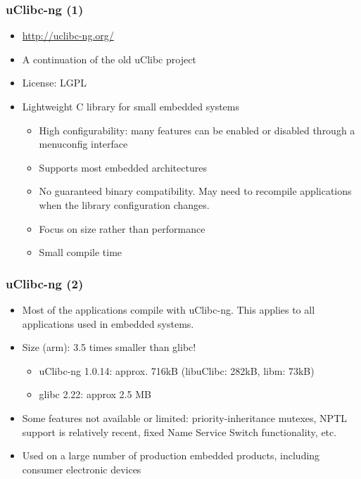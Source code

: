 \begin{frame}
  \frametitle{uClibc-ng (1)}
  \begin{itemize}
  \item \url{http://uclibc-ng.org/}
  \item A continuation of the old uClibc project
  \item License: LGPL
  \item Lightweight C library for small embedded systems
    \begin{itemize}
    \item High configurability: many features can be enabled or
      disabled through a menuconfig interface
    \item Supports most embedded architectures
    \item No guaranteed binary compatibility. May need to
      recompile applications when the library configuration changes.
    \item Focus on size rather than performance
    \item Small compile time
    \end{itemize}
  \end{itemize}
\end{frame}

\begin{frame}
  \frametitle{uClibc-ng (2)}
  \begin{itemize}
  \item Most of the applications compile with uClibc-ng. This applies to
    all applications used in embedded systems.
  \item Size (arm): 3.5 times smaller than glibc!
    \begin{itemize}
    \item uClibc-ng 1.0.14: approx. 716kB (libuClibc: 282kB, libm:
      73kB)
    \item glibc 2.22: approx 2.5 MB
    \end{itemize}
  \item Some features not available or limited: priority-inheritance
    mutexes, NPTL support is relatively recent, fixed Name Service Switch
    functionality, etc.
  \item Used on a large number of production embedded products,
    including consumer electronic devices
\end{itemize}
\end{frame}

